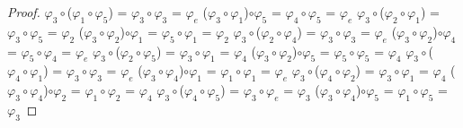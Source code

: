 \documentclass[10pt,a4paper,oneside]{article}
\begin{document}
\begin{proof}
					$\varphi_{3}\circ$($\varphi_{1}\circ\varphi_{5}$) = $\varphi_{3}\circ\varphi_{3}$ = $\varphi_{e}$
					\newline
					($\varphi_{3}\circ\varphi_{1}$)$\circ\varphi_{5}$ = $\varphi_{4}\circ\varphi_{5}$ = $\varphi_{e}$
					\newline
					\newline
					$\varphi_{3}\circ$($\varphi_{2}\circ\varphi_{1}$) = $\varphi_{3}\circ\varphi_{5}$ = $\varphi_{2}$
					\newline
					($\varphi_{3}\circ\varphi_{2}$)$\circ\varphi_{1}$ = $\varphi_{5}\circ\varphi_{1}$ = $\varphi_{2}$
					\newline
					\newline
					$\varphi_{3}\circ$($\varphi_{2}\circ\varphi_{4}$) = $\varphi_{3}\circ\varphi_{3}$ = $\varphi_{e}$
					\newline
					($\varphi_{3}\circ\varphi_{2}$)$\circ\varphi_{4}$ = $\varphi_{5}\circ\varphi_{4}$ = $\varphi_{e}$
					\newline
					\newline
					$\varphi_{3}\circ$($\varphi_{2}\circ\varphi_{5}$) = $\varphi_{3}\circ\varphi_{1}$ = $\varphi_{4}$
					\newline
					($\varphi_{3}\circ\varphi_{2}$)$\circ\varphi_{5}$ = $\varphi_{5}\circ\varphi_{5}$ = $\varphi_{4}$
					\newline
					\newline
					$\varphi_{3}\circ$($\varphi_{4}\circ\varphi_{1}$) = $\varphi_{3}\circ\varphi_{3}$ = $\varphi_{e}$
					\newline
					($\varphi_{3}\circ\varphi_{4}$)$\circ\varphi_{1}$ = $\varphi_{1}\circ\varphi_{1}$ = $\varphi_{e}$
					\newline
					\newline
					$\varphi_{3}\circ$($\varphi_{4}\circ\varphi_{2}$) = $\varphi_{3}\circ\varphi_{1}$ = $\varphi_{4}$
					\newline
					($\varphi_{3}\circ\varphi_{4}$)$\circ\varphi_{2}$ = $\varphi_{1}\circ\varphi_{2}$ = $\varphi_{4}$
					\newline
					\newline
					$\varphi_{3}\circ$($\varphi_{4}\circ\varphi_{5}$) = $\varphi_{3}\circ\varphi_{e}$ = $\varphi_{3}$
					\newline
					($\varphi_{3}\circ\varphi_{4}$)$\circ\varphi_{5}$ = $\varphi_{1}\circ\varphi_{5}$ = $\varphi_{3}$
					\newline
					\newline

\end{proof}
\end{document}
